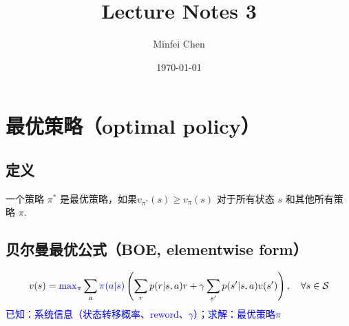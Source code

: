 \documentclass{article}
\begin{document}
\title{Lecture Notes 3}
\author{Minfei Chen}
\date{\today}
\maketitle
\section{最优策略（optimal policy）}
\subsection{定义}
一个策略 $\pi^*$ 是最优策略，如果$v_{\pi^*}(s) \ge v_{\pi}(s)$ 对于所有状态 $s$ 和其他所有策略 $\pi$.
\subsection{贝尔曼最优公式（BOE, elementwise form）}
$$
v(s) = \textcolor{blue}{\max}_{\pi} \sum_{a} \textcolor{blue}{\pi(a|s)} \left( \sum_{r} p(r|s, a)r + \gamma \sum_{s'} p(s'|s, a)v(s') \right), \quad \forall s \in \mathcal{S}
$$
\textcolor{blue}{\kaishu*已知：系统信息（状态转移概率、reword、$\gamma$）；求解：最优策略$\pi$}
\end{document}
